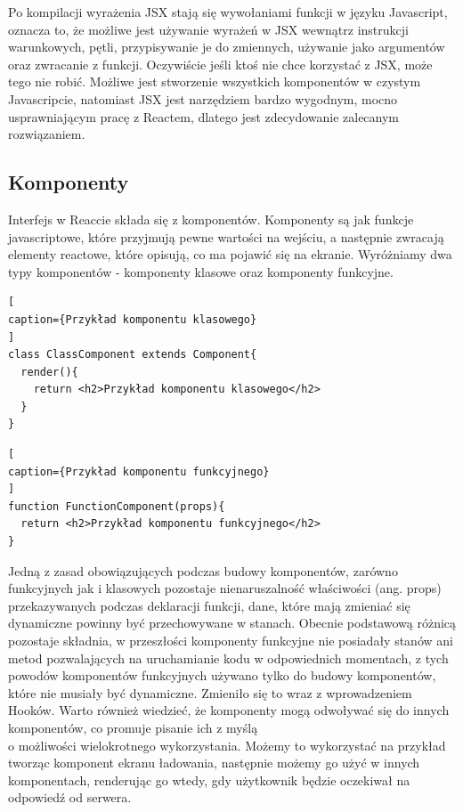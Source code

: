 \documentclass[oneside,polski,logo,indent]{amuthesis}
\begin{document}
{Po kompilacji wyrażenia JSX stają się wywołaniami funkcji w języku Javascript, oznacza to, że możliwe jest używanie wyrażeń w JSX wewnątrz instrukcji warunkowych, pętli, przypisywanie je do zmiennych, używanie jako argumentów oraz zwracanie z funkcji.
Oczywiście jeśli ktoś nie chce korzystać z JSX, może tego nie robić. Możliwe jest stworzenie wszystkich komponentów w czystym Javascripcie, natomiast JSX jest narzędziem bardzo wygodnym, mocno usprawniającym pracę z Reactem, dlatego jest zdecydowanie zalecanym rozwiązaniem.

}

\subsection{Komponenty}
{
Interfejs w Reaccie składa się z komponentów. Komponenty są jak funkcje javascriptowe, które przyjmują pewne wartości na wejściu, a następnie zwracają elementy reactowe, które opisują, co ma pojawić się na ekranie.
Wyróżniamy dwa typy komponentów - komponenty klasowe oraz komponenty funkcyjne.


\begin{lstlisting}[
caption={Przykład komponentu klasowego}
]
class ClassComponent extends Component{
  render(){
    return <h2>Przykład komponentu klasowego</h2>
  }
}

\end{lstlisting}


\begin{lstlisting}[
caption={Przykład komponentu funkcyjnego}
]
function FunctionComponent(props){
  return <h2>Przykład komponentu funkcyjnego</h2>
}

\end{lstlisting}

Jedną z zasad obowiązujących podczas budowy komponentów, zarówno funkcyjnych jak i klasowych pozostaje nienaruszalność właściwości (ang. props) przekazywanych podczas deklaracji funkcji, dane, które mają zmieniać się dynamiczne powinny być przechowywane w stanach.
Obecnie podstawową różnicą pozostaje składnia, w przeszłości komponenty funkcyjne nie posiadały stanów ani metod pozwalających na uruchamianie kodu w odpowiednich momentach, z tych powodów komponentów funkcyjnych używano tylko do budowy komponentów, które nie musiały być dynamiczne. Zmieniło się to wraz z wprowadzeniem Hooków.
Warto również wiedzieć, że komponenty mogą odwoływać się do innych komponentów, co promuje pisanie ich z myślą \\o możliwości wielokrotnego wykorzystania. Możemy to wykorzystać na przykład tworząc komponent ekranu ładowania, następnie możemy go użyć w innych komponentach, renderując go wtedy, gdy użytkownik będzie oczekiwał na odpowiedź od serwera.



}
\end{document}
